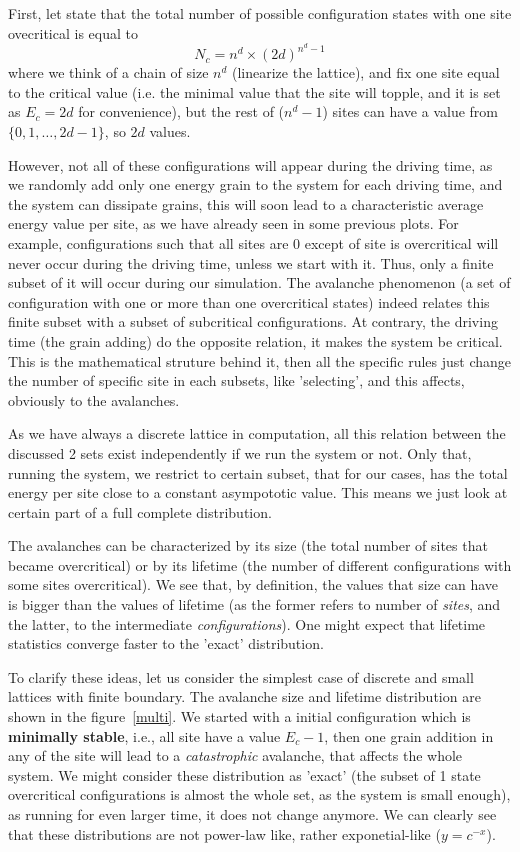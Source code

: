 First, let state that the total number of possible configuration states with one site ovecritical is equal to
\[
N_c=n^d\times (2d)^{n^d-1}
\]
where we think of a chain of size $n^d$ (linearize the lattice), and fix one site equal to the critical value 
(i.e. the minimal value that the site will topple, and it is set as $E_c=2d$ for convenience),
but the rest of ($n^d-1$) sites can have a value from $\{0,1, \ldots, 2d-1\}$, so $2d$ values.


However, not all of these configurations will appear during the driving time, as we randomly add only one energy grain to the system for each driving time, 
and the system can dissipate grains, this will soon lead to a characteristic average energy value per site, as we have already seen in some previous plots. 
For example, configurations such that all sites are 0 except of site is overcritical will never occur during the driving time, unless we start with it.
Thus, only a finite subset of it will occur during our simulation. 
The avalanche phenomenon (a set of configuration with one or more than one overcritical states) indeed relates this finite subset with a subset of subcritical configurations.
At contrary, the driving time (the grain adding) do the opposite relation, it makes the system be critical.
This is the mathematical struture behind it, then all the specific rules just change the number of specific site in each subsets,
like 'selecting', and this affects, obviously to the avalanches.

As we have always a discrete lattice in computation, all this relation between the discussed 2 sets exist independently if we run the system or not.
Only that, running the system, we restrict to certain subset, that for our cases, has the total energy per site close to a constant asympototic value.  
This means we just look at certain part of a full complete distribution. 

The avalanches can be characterized by its size (the total number of sites that became overcritical) 
or by its lifetime (the number of different configurations with some sites overcritical). We see that, by definition, 
the values that size can have is bigger than the values of lifetime (as the former refers to number of \emph{sites}, and the latter, to the intermediate \emph{configurations}).
One might expect that lifetime statistics converge faster to the 'exact' distribution. 

To clarify these ideas, let us consider the simplest case of discrete and small lattices with finite boundary.  
The avalanche size and lifetime distribution are shown in the figure~\ref{multi}.
We started with a initial configuration which is \textbf{minimally stable}, i.e., 
all site have a value $E_c-1$, then one grain addition in any of the site will lead to a \emph{catastrophic} avalanche, 
that affects the whole system. 
We might consider these distribution as 'exact' (the subset of 1 state overcritical configurations is almost the whole set, as the system is small enough), 
as running for even larger time, it does not change anymore. 
We can clearly see that these distributions are not power-law like, rather exponetial-like ($y=c^{-x}$). 

